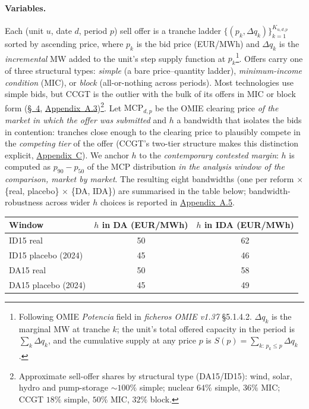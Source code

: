 \documentclass[11pt]{article}
\begin{document}
\paragraph{Variables.} Each (unit $u$, date $d$, period $p$) sell offer is a tranche ladder $\{(p_k, \Delta q_k)\}_{k=1}^{K_{u,d,p}}$ sorted by ascending price, where $p_k$ is the bid price (EUR/MWh) and $\Delta q_k$ is the \emph{incremental} MW added to the unit's step supply function at $p_k$\footnote{Following OMIE \emph{Potencia} field in \textit{ficheros OMIE v1.37} \S 5.1.4.2. $\Delta q_k$ is the marginal MW at tranche $k$; the unit's total offered capacity in the period is $\sum_k \Delta q_k$, and the cumulative supply at any price $p$ is $S(p)=\sum_{k:\,p_k\le p}\Delta q_k$.}. Offers carry one of three structural types: \emph{simple} (a bare price--quantity ladder), \emph{minimum-income condition} (MIC), or \emph{block} (all-or-nothing across periods). Most technologies use simple bids, but CCGT is the outlier with the bulk of its offers in MIC or block form (\hyperref[sec:results]{\S~4}, \hyperref[sec:5d]{Appendix~A.3})\footnote{Approximate sell-offer shares by structural type (DA15/ID15): wind, solar, hydro and pump-storage $\sim\!100\%$ simple; nuclear $64\%$ simple, $36\%$ MIC; CCGT $18\%$ simple, $50\%$ MIC, $32\%$ block.}. Let $\text{MCP}_{d,p}$ be the OMIE clearing price \emph{of the market in which the offer was submitted} and $h$ a bandwidth that isolates the bids in contention: tranches close enough to the clearing price to plausibly compete in the \emph{competing tier} of the offer (CCGT's two-tier structure makes this distinction explicit, \hyperref[sec:context]{Appendix~C}). We anchor $h$ to the \emph{contemporary contested margin}: $h$ is computed as $p_{90}-p_{50}$ of the MCP distribution \emph{in the analysis window of the comparison, market by market}. The resulting eight bandwidths (one per reform $\times$ \{real, placebo\} $\times$ \{DA, IDA\}) are summarised in the table below; bandwidth-robustness across wider $h$ choices is reported in \hyperref[sec:5e]{Appendix~A.5}.
\begin{center}
\footnotesize
\setlength{\tabcolsep}{8pt}
\begin{tabular}{l c c}
\toprule
\textbf{Window} & $h$ in DA (EUR/MWh) & $h$ in IDA (EUR/MWh) \\
\midrule
ID15 real             & 50 & 62 \\
ID15 placebo (2024)   & 45 & 46 \\
DA15 real             & 50 & 58 \\
DA15 placebo (2024)   & 45 & 49 \\
\bottomrule
\end{tabular}
\end{center}
\end{document}
